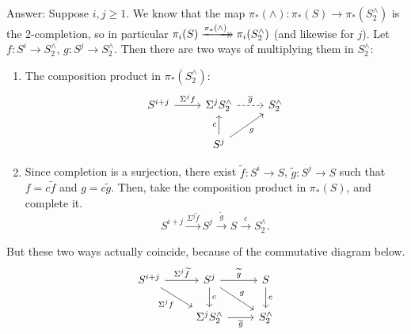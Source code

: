\documentclass{MetricNotes2023}
\newcommand{\xsurj}[2][]{%
  \xrightarrow[#1]{#2}\mathrel{\mkern-14mu}\rightarrow
}
\begin{document}
\begin{itemize}
\begin{enumerate}
Answer: Suppose \(i,j\geq 1\). We know that the map \(\pi_*(\wedge) : \pi_*(S) \to \pi_*(S^\wedge_2)\) is the 2-completion, so in particular \(\pi_i(S) \xsurj{\pi_*(\wedge)} \pi_i(S^\wedge_2)\) (and likewise for \(j\)). Let \(f : S^i \to S^\wedge_2\), \(g : S^j \to S^\wedge_2\). Then there are two ways of multiplying them in \(S^\wedge_2\):
\begin{enumerate}
\item The composition product in \(\pi_*(S^\wedge_2)\): \[\begin{tikzcd}
S^{i+j} \arrow[r, "\Sigma^j f"]  & \Sigma^j S^\wedge_2 \arrow[r, "\overline g", dashrightarrow] & S^\wedge_2 \\ 
 & S^j \arrow[u, "c"] \arrow[ur, "g"'] &  
 \end{tikzcd}\] 
\item Since completion is a surjection, there exist \(\widetilde f : S^i \to S\), \(\widetilde g : S^j \to S\) such that \(f = c\widetilde f\) and \(g = c \widetilde g\). Then, take the composition product in \(\pi_*(S)\), and complete it.
\[S^{i+j}\xrightarrow{\Sigma^j \widetilde f} S^j \xrightarrow{\widetilde g}S \xrightarrow{c}S^\wedge_2.\]
\end{enumerate}
But these two ways actually coincide, because of the commutative diagram below.
\[\begin{tikzcd}
S^{i+j} \arrow[r, "\Sigma^j \widetilde f"] \arrow[dr, swap, "\Sigma^j f"]  & S^j \arrow[dr, "g"] \arrow[r, "\widetilde g"] \arrow[d, "c"] & S \arrow[d, "c"] \\ 
 & \Sigma^j S^\wedge_2 \arrow[r, "\overline g"'] & S^\wedge_2 
 \end{tikzcd}\] 


\end{enumerate}
\end{itemize}
\end{document}
